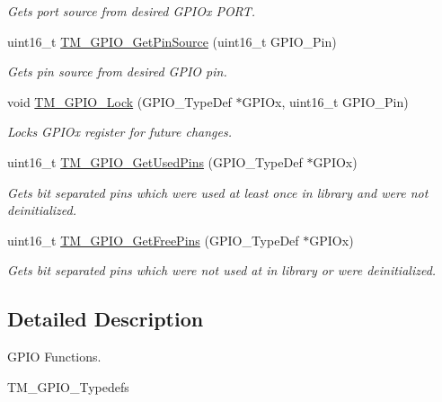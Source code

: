\begin{DoxyCompactItemize}
\begin{DoxyCompactList}\small\item\em Gets port source from desired G\+P\+I\+Ox P\+O\+RT. \end{DoxyCompactList}\item 
uint16\+\_\+t \hyperlink{group___t_m___g_p_i_o___functions_ga29aaed3ba7054d4c3a3fed55012403e5}{T\+M\+\_\+\+G\+P\+I\+O\+\_\+\+Get\+Pin\+Source} (uint16\+\_\+t G\+P\+I\+O\+\_\+\+Pin)
\begin{DoxyCompactList}\small\item\em Gets pin source from desired G\+P\+IO pin. \end{DoxyCompactList}\item 
void \hyperlink{group___t_m___g_p_i_o___functions_gaf52cf03a031c506fa46518a1e42c8ce2}{T\+M\+\_\+\+G\+P\+I\+O\+\_\+\+Lock} (G\+P\+I\+O\+\_\+\+Type\+Def $\ast$G\+P\+I\+Ox, uint16\+\_\+t G\+P\+I\+O\+\_\+\+Pin)
\begin{DoxyCompactList}\small\item\em Locks G\+P\+I\+Ox register for future changes. \end{DoxyCompactList}\item 
uint16\+\_\+t \hyperlink{group___t_m___g_p_i_o___functions_ga8fc67a53f59d23b221e82a4a71642f30}{T\+M\+\_\+\+G\+P\+I\+O\+\_\+\+Get\+Used\+Pins} (G\+P\+I\+O\+\_\+\+Type\+Def $\ast$G\+P\+I\+Ox)
\begin{DoxyCompactList}\small\item\em Gets bit separated pins which were used at least once in library and were not deinitialized. \end{DoxyCompactList}\item 
uint16\+\_\+t \hyperlink{group___t_m___g_p_i_o___functions_ga72bffec02520314763c10defc9406400}{T\+M\+\_\+\+G\+P\+I\+O\+\_\+\+Get\+Free\+Pins} (G\+P\+I\+O\+\_\+\+Type\+Def $\ast$G\+P\+I\+Ox)
\begin{DoxyCompactList}\small\item\em Gets bit separated pins which were not used at in library or were deinitialized. \end{DoxyCompactList}\end{DoxyCompactItemize}


\subsection{Detailed Description}
G\+P\+IO Functions. 

T\+M\+\_\+\+G\+P\+I\+O\+\_\+\+Typedefs 

